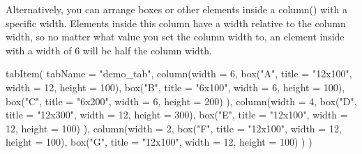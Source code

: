 \documentclass[
]{book}
\newenvironment{Shaded}{\begin{snugshade}}{\end{snugshade}}
\newcommand{\AttributeTok}[1]{\textcolor[rgb]{0.77,0.63,0.00}{#1}}
\newcommand{\DecValTok}[1]{\textcolor[rgb]{0.00,0.00,0.81}{#1}}
\newcommand{\FunctionTok}[1]{\textcolor[rgb]{0.00,0.00,0.00}{#1}}
\newcommand{\NormalTok}[1]{#1}
\newcommand{\StringTok}[1]{\textcolor[rgb]{0.31,0.60,0.02}{#1}}
\begin{document}
Alternatively, you can arrange boxes or other elements inside a column() with a specific width. Elements inside this column have a width relative to the column width, so no matter what value you set the column width to, an element inside with a width of 6 will be half the column width.

\begin{Shaded}
\begin{Highlighting}[]
\FunctionTok{tabItem}\NormalTok{(}
    \AttributeTok{tabName =} \StringTok{"demo\_tab"}\NormalTok{,}
    \FunctionTok{column}\NormalTok{(}\AttributeTok{width =} \DecValTok{6}\NormalTok{,}
        \FunctionTok{box}\NormalTok{(}\StringTok{"A"}\NormalTok{, }\AttributeTok{title =} \StringTok{"12x100"}\NormalTok{, }\AttributeTok{width =} \DecValTok{12}\NormalTok{, }\AttributeTok{height =} \DecValTok{100}\NormalTok{),}
        \FunctionTok{box}\NormalTok{(}\StringTok{"B"}\NormalTok{, }\AttributeTok{title =} \StringTok{"6x100"}\NormalTok{, }\AttributeTok{width =} \DecValTok{6}\NormalTok{, }\AttributeTok{height =} \DecValTok{100}\NormalTok{),}
        \FunctionTok{box}\NormalTok{(}\StringTok{"C"}\NormalTok{, }\AttributeTok{title =} \StringTok{"6x200"}\NormalTok{, }\AttributeTok{width =} \DecValTok{6}\NormalTok{, }\AttributeTok{height =} \DecValTok{200}\NormalTok{)}
\NormalTok{    ), }
    \FunctionTok{column}\NormalTok{(}\AttributeTok{width =} \DecValTok{4}\NormalTok{,}
        \FunctionTok{box}\NormalTok{(}\StringTok{"D"}\NormalTok{, }\AttributeTok{title =} \StringTok{"12x300"}\NormalTok{, }\AttributeTok{width =} \DecValTok{12}\NormalTok{, }\AttributeTok{height =} \DecValTok{300}\NormalTok{),}
        \FunctionTok{box}\NormalTok{(}\StringTok{"E"}\NormalTok{, }\AttributeTok{title =} \StringTok{"12x100"}\NormalTok{, }\AttributeTok{width =} \DecValTok{12}\NormalTok{, }\AttributeTok{height =} \DecValTok{100}\NormalTok{)}
\NormalTok{    ),}
    \FunctionTok{column}\NormalTok{(}\AttributeTok{width =} \DecValTok{2}\NormalTok{,}
        \FunctionTok{box}\NormalTok{(}\StringTok{"F"}\NormalTok{, }\AttributeTok{title =} \StringTok{"12x100"}\NormalTok{, }\AttributeTok{width =} \DecValTok{12}\NormalTok{, }\AttributeTok{height =} \DecValTok{100}\NormalTok{),}
        \FunctionTok{box}\NormalTok{(}\StringTok{"G"}\NormalTok{, }\AttributeTok{title =} \StringTok{"12x100"}\NormalTok{, }\AttributeTok{width =} \DecValTok{12}\NormalTok{, }\AttributeTok{height =} \DecValTok{100}\NormalTok{)}
\NormalTok{    )}
\NormalTok{)}
\end{Highlighting}
\end{Shaded}
\end{document}
